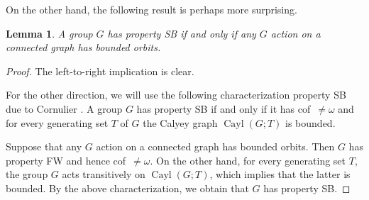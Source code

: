 \documentclass[a4paper]{article}
\newtheorem{lem}{Lemma}[section]
\theoremstyle{definition}
\DeclareMathOperator\Cayley{Cayl}
\begin{document}
On the other hand, the following result is perhaps more surprising.
%
%
\begin{lem}
A group $G$ has property SB if and only if any $G$ action on a connected graph has bounded orbits.
\end{lem}
\begin{proof}
The left-to-right implication is clear.

For the other direction, we will use the following characterization property SB due to Cornulier \cite{MR2240370}. A group $G$ has property SB if and only if it has cof~$\neq\omega$ and for every generating set $T$ of $G$ the Calyey graph $\Cayley(G;T)$ is bounded.

Suppose that any $G$ action on a connected graph has bounded orbits. Then $G$ has property FW and hence cof~$\neq\omega$. On the other hand, for every generating set $T$, the group $G$ acts transitively on $\Cayley(G;T)$, which implies that the latter is bounded. By the above characterization, we obtain that $G$ has property SB.
\end{proof}
\end{document}
